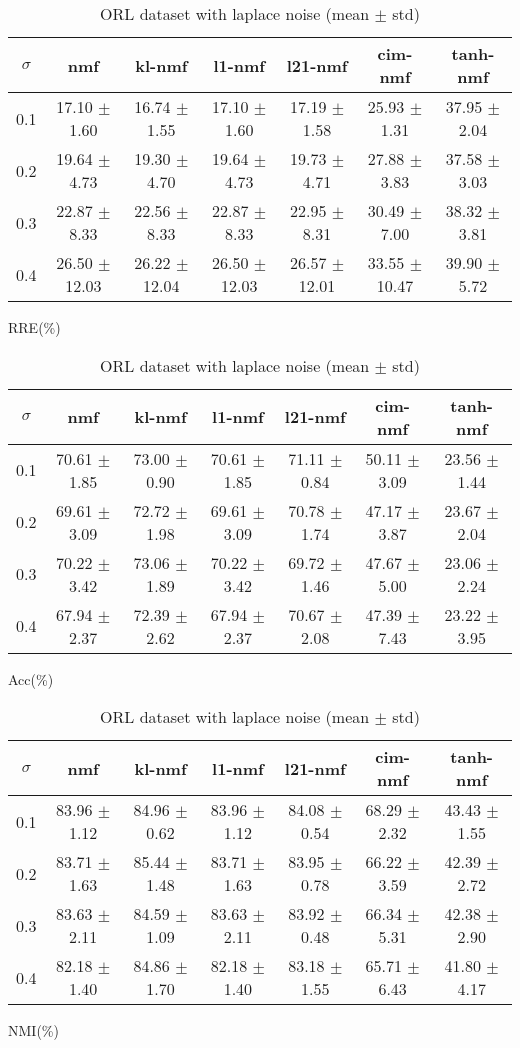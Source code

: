 \documentclass{article} %
\begin{document}
\begin{table}
\begin{subtable}{\linewidth}
\begin{tabular}{c|cccccc}$\sigma$ & nmf & kl-nmf & l1-nmf & l21-nmf & cim-nmf & tanh-nmf \\\hline
0.1 & 17.10 $\pm$ 1.60 & 16.74 $\pm$ 1.55 & 17.10 $\pm$ 1.60 & 17.19 $\pm$ 1.58 & 25.93 $\pm$ 1.31 & 37.95 $\pm$ 2.04 \\
0.2 & 19.64 $\pm$ 4.73 & 19.30 $\pm$ 4.70 & 19.64 $\pm$ 4.73 & 19.73 $\pm$ 4.71 & 27.88 $\pm$ 3.83 & 37.58 $\pm$ 3.03 \\
0.3 & 22.87 $\pm$ 8.33 & 22.56 $\pm$ 8.33 & 22.87 $\pm$ 8.33 & 22.95 $\pm$ 8.31 & 30.49 $\pm$ 7.00 & 38.32 $\pm$ 3.81 \\
0.4 & 26.50 $\pm$ 12.03 & 26.22 $\pm$ 12.04 & 26.50 $\pm$ 12.03 & 26.57 $\pm$ 12.01 & 33.55 $\pm$ 10.47 & 39.90 $\pm$ 5.72 \\
\end{tabular}\caption{RRE(\%)}\end{subtable}
\begin{subtable}{\linewidth}
\begin{tabular}{c|cccccc}$\sigma$ & nmf & kl-nmf & l1-nmf & l21-nmf & cim-nmf & tanh-nmf \\\hline
0.1 & 70.61 $\pm$ 1.85 & 73.00 $\pm$ 0.90 & 70.61 $\pm$ 1.85 & 71.11 $\pm$ 0.84 & 50.11 $\pm$ 3.09 & 23.56 $\pm$ 1.44 \\
0.2 & 69.61 $\pm$ 3.09 & 72.72 $\pm$ 1.98 & 69.61 $\pm$ 3.09 & 70.78 $\pm$ 1.74 & 47.17 $\pm$ 3.87 & 23.67 $\pm$ 2.04 \\
0.3 & 70.22 $\pm$ 3.42 & 73.06 $\pm$ 1.89 & 70.22 $\pm$ 3.42 & 69.72 $\pm$ 1.46 & 47.67 $\pm$ 5.00 & 23.06 $\pm$ 2.24 \\
0.4 & 67.94 $\pm$ 2.37 & 72.39 $\pm$ 2.62 & 67.94 $\pm$ 2.37 & 70.67 $\pm$ 2.08 & 47.39 $\pm$ 7.43 & 23.22 $\pm$ 3.95 \\
\end{tabular}\caption{Acc(\%)}\end{subtable}
\begin{subtable}{\linewidth}
\begin{tabular}{c|cccccc}$\sigma$ & nmf & kl-nmf & l1-nmf & l21-nmf & cim-nmf & tanh-nmf \\\hline
0.1 & 83.96 $\pm$ 1.12 & 84.96 $\pm$ 0.62 & 83.96 $\pm$ 1.12 & 84.08 $\pm$ 0.54 & 68.29 $\pm$ 2.32 & 43.43 $\pm$ 1.55 \\
0.2 & 83.71 $\pm$ 1.63 & 85.44 $\pm$ 1.48 & 83.71 $\pm$ 1.63 & 83.95 $\pm$ 0.78 & 66.22 $\pm$ 3.59 & 42.39 $\pm$ 2.72 \\
0.3 & 83.63 $\pm$ 2.11 & 84.59 $\pm$ 1.09 & 83.63 $\pm$ 2.11 & 83.92 $\pm$ 0.48 & 66.34 $\pm$ 5.31 & 42.38 $\pm$ 2.90 \\
0.4 & 82.18 $\pm$ 1.40 & 84.86 $\pm$ 1.70 & 82.18 $\pm$ 1.40 & 83.18 $\pm$ 1.55 & 65.71 $\pm$ 6.43 & 41.80 $\pm$ 4.17 \\
\end{tabular}\caption{NMI(\%)}\end{subtable}
\caption{ORL dataset with laplace noise (mean $\pm$ std)}
\end{table}
\end{document}
